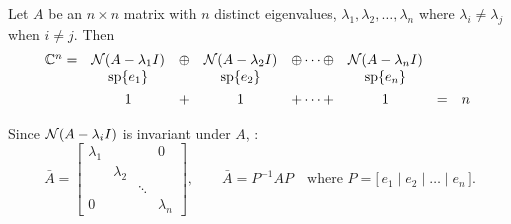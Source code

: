 \begin{theorem}
\leavevmode{}Let $A$ be an $n\times n$ matrix with $n$ distinct eigenvalues, $\lambda_1,\lambda_2,\dots,\lambda_n$ where $\lambda_i\neq\lambda_j$ when $i\neq j$. Then
\[
\begin{array}{rccccccc@{\;}l}
\C^n = & \Null(A-\lambda_1 I) & \oplus & \Null(A-\lambda_2 I) & \oplus\cdots\oplus & \Null(A-\lambda_n I) & & & \\
 & \Span\{e_1\} & & \Span\{e_2\} & & \Span\{e_n\} & & & \\[4pt]
 & 1 & + & 1 & +\cdots+ & 1 & = & n &
\end{array}
\]
\end{theorem}
Since $\mathcal{N}(A-\lambda_i I)$ is invariant under $A$, :
\[
\bar A=\begin{bmatrix}\lambda_1 & & & 0\\ & \lambda_2 & & \\ & & \ddots & \\ 0 & & & \lambda_n\end{bmatrix},
\qquad \bar A = P^{-1}AP \quad\text{where } P=\big[\,e_1 \mid e_2 \mid \dots \mid e_n\,\big].
\]

